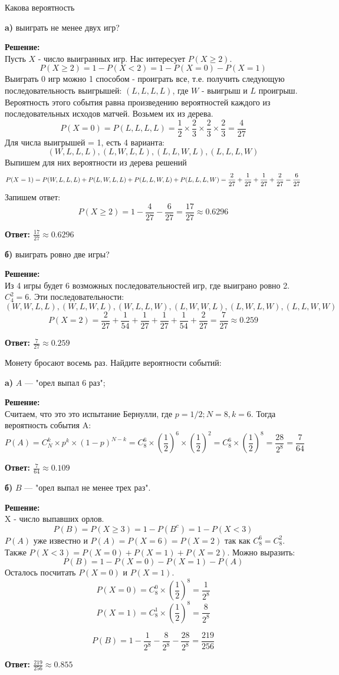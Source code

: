 \documentclass[a4paper,12pt]{article}
\renewcommand{\geq}{\geqslant}
\newcounter{z}
\newcommand{\z}{\refstepcounter{z}\vskip 20pt\noindent
\fbox{\textbf{\arabic{z}}} }
\begin{document}
Какова вероятность

{\bf a)} выиграть не менее двух игр?

\textbf{Решение:}\\
Пусть $X$ - число выигранных игр. Нас интересует $P(X\geq2)$.
$$P(X\geq2) = 1 - P(X<2) = 1 - P(X = 0) - P(X = 1)$$
Выиграть 0 игр можно 1 способом - проиграть все, т.е. получить следующую последовательность выигрышей: $(L, L, L, L)$, где $W$ - выигрыш и $L$ проигрыш. Вероятность этого события равна произведению вероятностей каждого из последовательных исходов матчей. Возьмем их из дерева.
$$P(X = 0) = P(L, L, L, L) =\frac{1}{2}\times\frac{2}{3}\times\frac{2}{3}\times\frac{2}{3} = \frac{4}{27}$$
Для числа выигрышей = 1, есть 4 варианта:
$$(W, L, L, L), (L, W, L, L), (L, L, W, L), (L, L, L, W)$$
Выпишем для них вероятности из дерева решений
$$
P(X = 1) = P(W, L, L, L)+P(L, W, L, L) + P(L, L, W, L)+P(L, L, L, W) \\= \frac{2}{27}+\frac{1}{27}+\frac{1}{27}+\frac{2}{27} = \frac{6}{27}
$$
Запишем ответ:
$$P(X\geq2) = 1 - \frac{4}{27} - \frac{6}{27} = \frac{17}{27} \approx0.6296$$

\textbf{Ответ: $\frac{17}{27} \approx0.6296$}

{\bf б)} выиграть ровно две игры?

\textbf{Решение:}\\
Из 4 игры будет 6 возможных последовательностей игр, где выиграно ровно 2. $C^2_4 = 6$. Эти последовательности: 
$$(W, W, L, L), (W, L, W, L), (W, L, L, W), (L, W, W, L), (L, W, L, W), (L, L, W, W)$$
$$P(X = 2) =  \frac{2}{27}+\frac{1}{54}+\frac{1}{27}+\frac{1}{27}+\frac{1}{54}+\frac{2}{27} = \frac{7}{27}\approx0.259$$

\textbf{Ответ: $\frac{7}{27} \approx0.259$}

\z Монету бросают восемь раз. Найдите вероятности событий:

{\bf a)} $A$ --- "орел выпал 6 раз";

\textbf{Решение:}\\
Считаем, что это это испытание Бернулли, где $p=1/2; N=8, k=6$. Тогда вероятность события A:
$$P(A) = C^k_N\times p^k \times (1-p)^{N-k} = C^6_8\times ({\frac{1}{2}})^6 \times ({\frac{1}{2}})^{2} = C^6_8\times ({\frac{1}{2}})^8= \frac{28}{2^8}=\frac{7}{64}$$

\textbf{Ответ: $\frac{7}{64} \approx0.109$}

{\bf б)} $B$ --- "орел выпал не менее трех раз".

\textbf{Решение:}\\
X - число выпавших орлов.
$$P(B) = P(X \geq 3)=1-P(B^c)= 1-P(X<3)$$
$P(A)$ уже известно и $P(A) = P(X=6) = P(X=2)$ так как $C^6_8=C^2_8$. Также $P(X<3) = P(X=0)+P(X=1)+P(X=2)$. Можно выразить:
$$P(B) = 1-P(X=0)-P(X=1)-P(A)$$
Осталось посчитать $P(X=0)$ и $P(X=1)$.
$$P(X=0) = C^0_8\times ({\frac{1}{2}})^8= \frac{1}{2^8}$$
$$P(X=1) = C^1_8\times ({\frac{1}{2}})^8= \frac{8}{2^8}$$


$$P(B) = 1-\frac{1}{2^8}-\frac{8}{2^8}-\frac{28}{2^8} =\frac{219}{256} $$

\textbf{Ответ: $\frac{219}{256} \approx0.855$}
\end{document}
